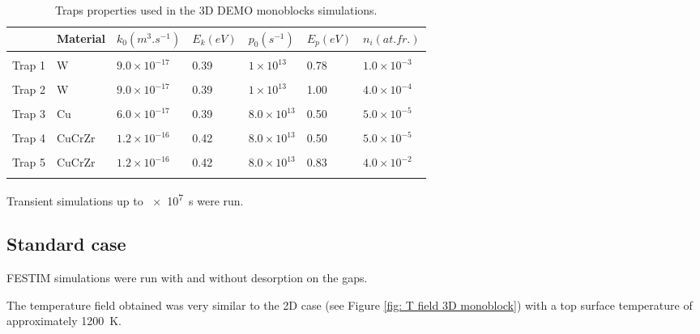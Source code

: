 \begin{table}
    \centering
    \begin{tabular}{L{1.5cm} L{1.5cm} R{1.6cm} R{1.1cm} R{1.6cm} R{1.1cm} R{2cm}}
         & Material & $k_0 (\si{m^3.s^{-1}})$ &  $E_k (\si{eV})$ & $p_0 (\si{s^{-1}})$ & $E_p (\si{eV})$ & $n_i (\si{at.fr.})$ \\
        \hline
        \\
        Trap 1 & W & $9.0 \times 10^{-17}$ & 0.39 & $1 \times 10^{13}$& 0.78 & $1.0 \times 10^{-3}$ \\
        \\
       Trap 2 & W & $9.0 \times 10^{-17}$ & 0.39 & $1 \times 10^{13}$& 1.00 & $4.0 \times 10^{-4}$ \\
        \\
        Trap 3 & Cu & $6.0 \times 10^{-17}$ & 0.39 & $8.0 \times 10^{13}$ & 0.50 &$5.0 \times 10^{-5}$\\
        \\
        Trap 4 & CuCrZr & $1.2\times 10^{-16}$ & 0.42 & $8.0 \times 10^{13}$ & 0.50 &$5.0 \times 10^{-5}$\\
        \\
        Trap 5 & CuCrZr & $1.2\times 10^{-16}$ & 0.42 & $8.0 \times 10^{13}$ & 0.83 &$4.0 \times 10^{-2}$\\
        \\
    \end{tabular}
    \caption{Traps properties used in the 3D DEMO monoblocks simulations.}
    \label{tab:traps monoblock DEMO}
\end{table}

Transient simulations up to \SI{e7}{s} were run.

\subsection{Standard case}

FESTIM simulations were run with and without desorption on the gaps.


The temperature field obtained was very similar to the 2D case (see Figure \ref{fig: T field 3D monoblock}) with a top surface temperature of approximately \SI{1200}{K}.

